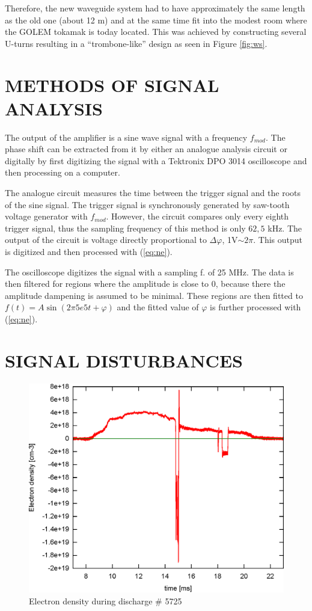 \documentclass[a4paper,twoside]{articlek}
\begin{document}
Therefore, the new waveguide system had to have approximately the same length as the old one (about 12 m) and at the same time fit into the modest room where the GOLEM tokamak is today located. 
This was achieved by constructing several U-turns resulting in a ``trombone-like'' design as seen in Figure \ref{fig:ws}.

\section{METHODS OF SIGNAL ANALYSIS}

The output of the amplifier is a sine wave signal with a frequency $f_{mod}$. The phase shift can be extracted from it by either an analogue analysis circuit or digitally by first digitizing the signal with a Tektronix DPO 3014 oscilloscope and then processing on a computer. 

The analogue circuit measures the time between the trigger signal and the roots of the sine signal. The trigger signal is synchronously generated by saw-tooth voltage generator with $f_{mod}$. However, the circuit compares only every eighth trigger signal, thus the sampling frequency of this method is only $62,5$ kHz. The output of the circuit is voltage directly proportional to $\Delta \varphi $, 1V$\sim 2\pi$. This output is digitized and then processed with (\ref{eq:ne}).

The oscilloscope digitizes the signal with a sampling f. of 25 MHz. The data is then filtered for regions where the amplitude is close to 0, because there the amplitude dampening is assumed to be minimal. These regions are then fitted to $f(t)=A\sin(2 \pi 5e5 t+ \varphi)$ and the fitted value of $\varphi$ is further processed with (\ref{eq:ne}).

\section{SIGNAL DISTURBANCES}
\begin{figure}
    \begin{center}
        \includegraphics[width=.45\textwidth]{data.eps}
    \end{center}
    \caption{Electron density during discharge \# 5725}
    \label{fig:data}
\end{figure}
\end{document}
